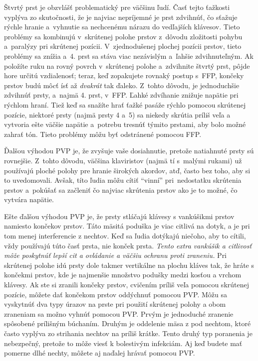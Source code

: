 Štvrtý prst je obzvlášť problematický pre väčšinu ľudí. Časť tejto ťažkosti vyplýva zo skutočnosti, že je najviac nepríjemné je prst zdvihnúť, čo sťažuje rýchle hranie a~vyhnutie sa nechcenému nárazu do vedľajších klávesov. Tieto problémy sa kombinujú v~skrútenej polohe prstov z~dôvodu zložitosti pohybu a~paralýzy pri skrútenej pozícii. V~zjednodušenej plochej pozícii prstov, tieto problémy sa znížia a~4. prst sa stáva viac nezávislým a~ľahšie zdvihnuteľným. Ak položíte ruku na rovný povrch v~skrútenej polohe a~zdvihnite štvrtý prst, pôjde hore určitú vzdialenosť; teraz, keď  zopakujete rovnaký postup s~FFP, končeky prstov budú môcť ísť až \textit{dvakrát} tak ďaleko. Z~tohto dôvodu, je jednoduchšie zdvihnúť prsty, a~najmä 4. prst, v~FFP. Ľahké zdvíhanie znižuje napätie pri rýchlom hraní. Tiež keď sa snažíte hrať ťažké pasáže rýchlo pomocou skrútenej pozície, niektoré prsty (najmä prsty 4 a~5) sa niekedy skrútia príliš veľa a vytvoria ešte väčšie napätie a~potrebu tresnúť týmito prstami, aby bolo možné zahrať tón. Tieto problémy môžu byť odstránené pomocou FFP. 

Ďalšou výhodou PVP je, že zvyšuje vaše dosiahnutie, pretože natiahnuté prsty sú rovnejšie. Z~tohto dôvodu, väčšina klaviristov (najmä tí s~malými rukami) už používajú ploché polohy pre hranie širokých akordov, atď, často bez toho, aby si to uvedomovali. Avšak, títo ľudia môžu cítiť “vinní” pri~nedostatku skrútenia prstov a~pokúšať sa začleniť čo najviac skrútenia prstov ako je to možné, čo vytvára napätie.

Ešte ďalšou výhodou PVP je, že prsty stláčajú klávesy s vankúšikmi prstov namiesto končekov prstov. Táto mäsitá poduška je viac citlivá na dotyk, a je pri tom menej interferencie z nechtov. Keď sa ľudia dotýkajú niečoho, aby to cítili, vždy používajú túto časť prsta, nie konček prsta. \emph{Tento extra vankúšik a citlivosť môže poskytnúť lepší cit a ovládanie a väčšiu ochranu proti zraneniu.} Pri skrútenej polohe idú prsty dole takmer vertikálne na plochu kláves tak, že hráte s končekmi prstov, kde je najmenšie množstvo podušky medzi kosťou a vrchom klávesy. Ak ste si zranili končeky prstov, cvičením príliš veľa pomocou skrútenej pozície, môžete dať končekom prstov oddýchnuť pomocou PVP. Môžu sa vyskytnúť dva typy úrazov na prste pri použití skrútenej polohy a obom zraneniam sa možno vyhnúť pomocou PVP. Prvým je jednoduché zranenie spôsobené prílišným búchaním. Druhým je oddelenie mäsa z pod nechtom, ktoré často vyplýva zo strihania nechtov na príliš krátke. Tento druhý typ poranenia je nebezpečný, pretože to môže viesť k bolestivým infekciám. Aj keď budete mať pomerne dlhé nechty, môžete aj naďalej hrávať pomocou PVP.

